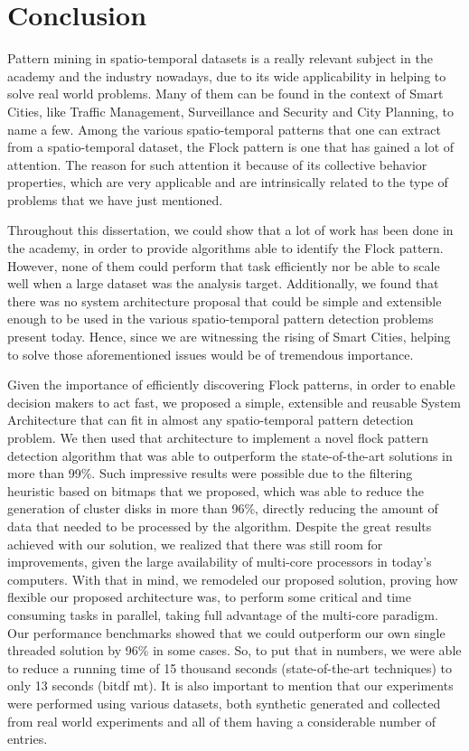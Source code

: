\chapter{Conclusion}
\label{chp:conclusion}
Pattern mining in spatio-temporal datasets is a really relevant subject in the academy and the industry nowadays, due
to its wide applicability in helping to solve real world problems. Many of them can be found in the context of Smart
Cities, like Traffic Management, Surveillance and Security and City Planning, to name a few. Among the various
spatio-temporal patterns that one can extract from a spatio-temporal dataset, the Flock pattern is one that has gained a
lot of attention. The reason for such attention it because of its collective behavior properties, which are very
applicable and are intrinsically related to the type of problems that we have just mentioned.

Throughout this dissertation, we could show that a lot of work has been done in the academy, in order to provide
algorithms able to identify the Flock pattern. However, none of them could perform that task efficiently nor be able to
scale well when a large dataset was the analysis target. Additionally, we found that there was no system architecture
proposal that could be simple and extensible enough to be used in the various spatio-temporal pattern detection problems
present today. Hence, since we are witnessing the rising of Smart Cities, helping to solve those aforementioned issues
would be of tremendous importance.

Given the importance of efficiently discovering Flock patterns, in order to enable decision makers to act fast, we
proposed a simple, extensible and reusable System Architecture that can fit in almost any spatio-temporal pattern
detection problem. We then used that architecture to implement a novel flock pattern detection algorithm that was able
to outperform the state-of-the-art solutions in more than 99\%. Such impressive results were possible due to the
filtering heuristic based on bitmaps that we proposed, which was able to reduce the generation of cluster disks in more
than 96\%, directly reducing the amount of data that needed to be processed by the algorithm. Despite the great results
achieved with our solution, we realized that there was still room for improvements, given the large availability of
multi-core processors in today's computers. With that in mind, we remodeled our proposed solution, proving how flexible
our proposed architecture was, to perform some critical and time consuming tasks in parallel, taking full advantage of
the multi-core paradigm. Our performance benchmarks showed that we could outperform our own single threaded solution by
96\% in some cases. So, to put that in numbers, we were able to reduce a running time of 15 thousand seconds
(state-of-the-art techniques) to only 13 seconds (\ac{bitdf} \ac{mt}). It is also important to mention that our
experiments were performed using various datasets, both synthetic generated and collected from real world experiments
and all of them having a considerable number of entries.

